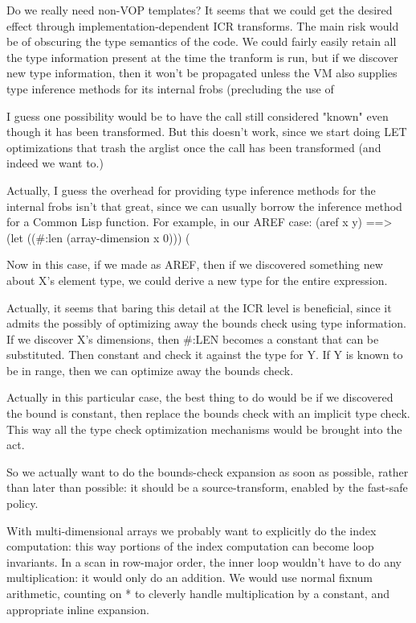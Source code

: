 Do we really need non-VOP templates?  It seems that we could get the desired
effect through implementation-dependent ICR transforms.  The main risk would be
of obscuring the type semantics of the code.  We could fairly easily retain all
the type information present at the time the tranform is run, but if we
discover new type information, then it won't be propagated unless the VM also
supplies type inference methods for its internal frobs (precluding the use of

I guess one possibility would be to have the call still considered "known" even
though it has been transformed.  But this doesn't work, since we start doing
LET optimizations that trash the arglist once the call has been transformed
(and indeed we want to.)

Actually, I guess the overhead for providing type inference methods for the
internal frobs isn't that great, since we can usually borrow the inference
method for a Common Lisp function.  For example, in our AREF case:
    (aref x y)
==>
    (let ((\#:len (array-dimension x 0)))
      (%

Now in this case, if we made %
as AREF, then if we discovered something new about X's element type, we could
derive a new type for the entire expression.

Actually, it seems that baring this detail at the ICR level is beneficial,
since it admits the possibly of optimizing away the bounds check using type
information.  If we discover X's dimensions, then \#:LEN becomes a constant that
can be substituted.  Then %
constant and check it against the type for Y.  If Y is known to be in range,
then we can optimize away the bounds check.

Actually in this particular case, the best thing to do would be if we
discovered the bound is constant, then replace the bounds check with an
implicit type check.  This way all the type check optimization mechanisms would
be brought into the act.

So we actually want to do the bounds-check expansion as soon as possible,
rather than later than possible: it should be a source-transform, enabled by
the fast-safe policy.

With multi-dimensional arrays we probably want to explicitly do the index
computation: this way portions of the index computation can become loop
invariants.  In a scan in row-major order, the inner loop wouldn't have to do
any multiplication: it would only do an addition.  We would use normal
fixnum arithmetic, counting on * to cleverly handle multiplication by a
constant, and appropriate inline expansion.

